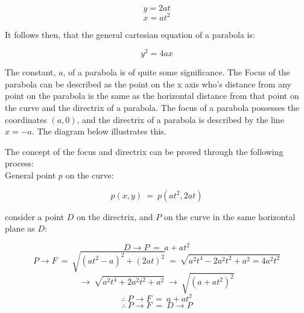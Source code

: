 \documentclass{article}
\begin{document}
\[y=2at\]
\[x=at^2\]

\noindent It follows then, that the general cartesian equation of a parabola is:

\[y^2=4ax\]

\noindent The constant, \(a\), of a parabola is of quite some significance. The Focus of the parabola can be described as the point on the x axis who's distance from any point on the parabola is the same as the horizontal distance from that point on the curve and the directrix of a parabola. The focus of a parabola possesses the coordinates \((a,0)\), and the directrix of a parabola is described by the line \(x=-a\). The diagram below illustrates this.

\begin{center}
\end{center}

\noindent The concept of the focus and directrix can be proved through the following process:\\

\noindent General point \(p\) on the curve:

\[p(x,y) \:=\: p\left(at^2,2at\right)\]

\noindent consider a point \(D\) on the directrix, and \(P\) on the curve in the same horizontal plane as \(D\):

\[D\rightarrow P \:=\: a+at^2\]
\[P\rightarrow F \:=\: \sqrt{\left(at^2-a\right)^2+\left(2at\right)^2} \:=\: \sqrt{a^2t^4-2a^2t^2+a^2=4a^2t^2}\]
\[\rightarrow\: \sqrt{a^2t^4+2a^2t^2+a^2} \:\rightarrow\: \sqrt{\left(a+at^2\right)^2}\]
\[\therefore \: P\rightarrow F \:=\: a+at^2\]
\[\therefore \: P\rightarrow F \:=\: D\rightarrow P\]
\end{document}
